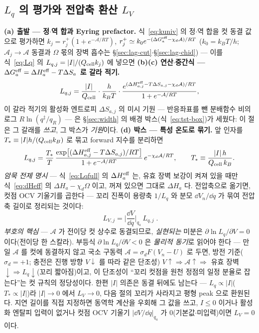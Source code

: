 \subsection{$L_q$ 의 평가와 전압축 환산 $L_V$}\label{sec:lag-LV}
\textbf{(a) 출발 --- 정$\cdot$역 합과 Eyring prefactor.} 식~\eqref{eq:kuniv} 의 정$\cdot$역 합을 컷 동결
값으로 평가하면 $k_j=r_j^+(1+e^{-\mathcal A/RT})$, $r_j^+\simeq k_0e^{-(\Delta G_a^{\mathrm{eff}}-\chi_d\mathcal A)/RT}$
($k_0=k_BT/h$; $\mathcal A_j\to\mathcal A$ 동결과 $\Omega$ 몫의 장벽 흡수는 \S\ref{sec:lag-cut}$\cdot$\S\ref{sec:lag-chid})
--- 이를 식~\eqref{eq:Lq} 의 $L_{q,j}=|I|/(Q_{\mathrm{cell}} k_j)$
에 넣으면 \textbf{(b)(c) 연산$\cdot$중간식 --- $\Delta G_a^{\mathrm{eff}}=\Delta H_a^{\mathrm{eff}}-T\Delta S_a$ 로 갈라 적기.}
\begin{equation}
L_{q,j}=\frac{|I|}{Q_{\mathrm{cell}}}\cdot\frac{h}{k_BT}\cdot
\frac{e^{(\Delta H_{a,j}^{\mathrm{eff}}-T\Delta S_{a,j}-\chi_d\mathcal A)/RT}}{1+e^{-\mathcal A/RT}},
\label{eq:Lqmid2}
\end{equation}
이 갈라 적기의 활성화 엔트로피 $\Delta S_{a,j}$ 의 미시 기원 --- 반응좌표를 뺀 분배함수 비의 로그
$R\ln(q^{\ddagger}/q_R)$ --- 은 \S\ref{sec:width} 의 배경 박스(식~\eqref{eq:tst-box})가 세웠다: 이 절은 그
갈래를 \emph{쓰고}, 그 박스가 \emph{기원}이다.
\textbf{(d) 박스 --- 특성 온도로 묶기.} 앞 인자를 $T_*\equiv|I|h/(Q_{\mathrm{cell}} k_B)$ 로 묶고 forward 지수를 분리하면
\begin{equation}
L_{q,j}=\frac{T_*}{T}\,\frac{\exp\!\big[(\Delta H_{a,j}^{\mathrm{eff}}-T\Delta S_{a,j})/RT\big]}{1+e^{-\mathcal A/RT}}
\,e^{-\chi_d\mathcal A/RT},
\qquad T_*\equiv\frac{|I|\,h}{Q_{\mathrm{cell}}\,k_B}.
\label{eq:Lqfull}
\end{equation}
\emph{암묵 전제 명시} --- 식~\eqref{eq:Lqfull} 의
$\Delta H_a^{\mathrm{eff}}$ 는, 유효 장벽 보강이 켜져 있을 때만 식~\eqref{eq:dHeff} 의 $\Delta H_a-\chi_d\Omega$ 이고,
꺼져 있으면 그대로 $\Delta H_a$ 다. 전압축으로 옮기면, 컷점 OCV 기울기를 곱한다 --- 꼬리 진폭이
용량축 $1/L_q$ 와 분모 $\dd V_n/\dd q$ 가 묶여 전압축 길이로 정리되는 것이다:
\begin{equation}
\boxed{\;L_{V,j}=\Big|\frac{\dd V}{\dd q}\Big|_{q_a}\,L_{q,j}\;.}
\label{eq:LV}
\end{equation}
\emph{부호의 핵심} --- $\mathcal A$ 가 전이당 컷 상수로 동결되므로, \emph{실현되는} 미분은
$\partial\ln L_q/\partial V=0$ 이다(전이당 한 스칼라). 부등식 $\partial\ln L_q/\partial V<0$ 은 \emph{물리적 동기}로 읽어야
한다 --- 만일 $\mathcal A$ 를 컷에 동결하지 않고 국소 구동력 $\mathcal A=\sigma_dF(V_n-U)$ 로 두면, 방전
기준($\sigma_d=+1$; 충전은 진행 방향 $V\!\downarrow$ 를 따라 같은 단조성) $V\!\uparrow\Rightarrow
\mathcal A\!\uparrow\Rightarrow$ 유효 장벽$\downarrow\Rightarrow L_q\downarrow$(꼬리 짧아짐)이고, 이 단조성이 ``꼬리 컷점을
원천 정점의 일정 분율로 잡는다''는 컷 규칙의 정당성이다. 한편 $|I|$ 의존은 동결 뒤에도 남는다 --- $L_q\propto|I|$($T_*\propto|I|$)라 $|I|\to0$
에서 $L_V\to0$, 다음 절의 꼬리가 사라지고 평형 peak 으로 환원된다. 지연 길이를 직접 지정하면 동역학 계산을 우회해
그 값을 쓰고, $I\le0$ 이거나 활성화 엔탈피 입력이 없거나 컷점 OCV 기울기 $|\dd V/\dd q|_{q_a}$ 가
$0$(기본값$\cdot$미입력)이면 $L_V=0$ 이다.

